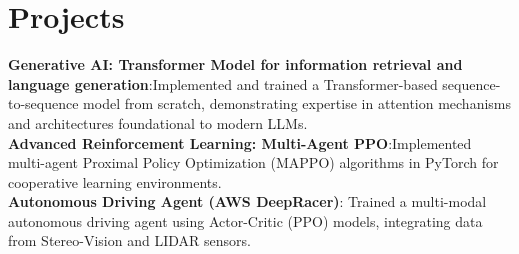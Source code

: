 \documentclass[letterpaper,11pt]{article}
\begin{document}

  \section{Projects}
    \begin{itemize}[leftmargin=0.15in, label={}]
      \small{\item{
        \textbf{Generative AI: Transformer Model for information retrieval and language generation}{:Implemented and trained a Transformer-based sequence-to-sequence model from scratch, demonstrating expertise in attention mechanisms and architectures foundational to modern LLMs.} \\
        \textbf{Advanced Reinforcement Learning: Multi-Agent PPO}{:Implemented multi-agent Proximal Policy Optimization (MAPPO) algorithms in PyTorch for cooperative learning environments.} \\
        \textbf{Autonomous Driving Agent (AWS DeepRacer)}{: Trained a multi-modal autonomous driving agent using Actor-Critic (PPO) models, integrating data from Stereo-Vision and LIDAR sensors.} \\
      }}
      \end{itemize}

% 


\end{document}
